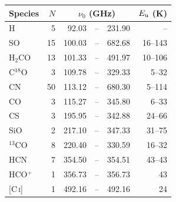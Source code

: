 \begin{tabular}{@{}lrr@{\,}c@{\,}rr@{}}
\hline
Species & $N$ & \multicolumn{3}{c}{$\nu_0$ (GHz)} & $E_{\rm u}$ (K) \\
\hline
H & 5 & 92.03 & -- & 231.90 & -- \\
SO & 15 & 100.03 & -- & 682.68 & 16--143 \\
H$_2$CO & 13 & 101.33 & -- & 491.97 & 10--106 \\
C$^{18}$O & 3 & 109.78 & -- & 329.33 & 5--32 \\
CN & 50 & 113.12 & -- & 680.30 & 5--114 \\
CO & 3 & 115.27 & -- & 345.80 & 6--33 \\
CS & 3 & 195.95 & -- & 342.88 & 24--66 \\
SiO & 2 & 217.10 & -- & 347.33 & 31--75 \\
$^{13}$CO & 8 & 220.40 & -- & 330.59 & 16--32 \\
HCN & 7 & 354.50 & -- & 354.51 & 43--43 \\
HCO$^{+}$ & 1 & 356.73 & -- & 356.73 & 43 \\
{[C\,\textsc{i}]} & 1 & 492.16 & -- & 492.16 & 24 \\
\hline
\end{tabular}%
